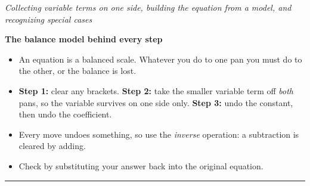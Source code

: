 \documentclass[12pt]{article}
\begin{document}

\begin{center}
\textit{Collecting variable terms on one side, building the equation from a model, and
recognizing special cases}
\end{center}

\noindent\textbf{The balance model behind every step}
\begin{itemize}[leftmargin=0.9cm, itemsep=1pt, topsep=2pt]
  \item An equation is a balanced scale. Whatever you do to one pan you must do to the
        other, or the balance is lost.
  \item \textbf{Step 1:} clear any brackets. \textbf{Step 2:} take the smaller variable
        term off \emph{both} pans, so the variable survives on one side only.
        \textbf{Step 3:} undo the constant, then undo the coefficient.
  \item Every move undoes something, so use the \emph{inverse} operation: a subtraction is
        cleared by adding.
  \item Check by substituting your answer back into the original equation.
\end{itemize}

\vspace{0.15cm}
\noindent\rule{\linewidth}{0.4pt}

\vspace{0.15cm}


\end{document}
